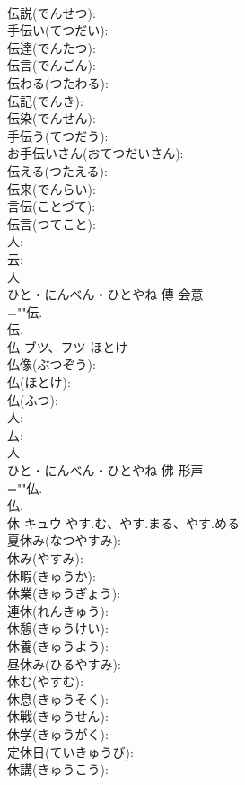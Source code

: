 \documentclass[8pt]{extreport}
\begin{document}
\begin{CJK}{UTF8}{min}
\\	伝説(でんせつ): 
\\	手伝い(てつだい): 
\\	伝達(でんたつ): 
\\	伝言(でんごん): 
\\	伝わる(つたわる): 
\\	伝記(でんき): 
\\	伝染(でんせん): 
\\	手伝う(てつだう): 
\\	お手伝いさん(おてつだいさん): 
\\	伝える(つたえる): 
\\	伝来(でんらい): 
\\	言伝(ことづて): 
\\	伝言(つてこと): 
\\	人: 
\\	云: 
\\	人	
\\	ひと・にんべん・ひとやね	傳	会意 
\\	=""伝.
\\	伝.
\\	仏	ブツ、フツ	ほとけ		
\\	仏像(ぶつぞう): 
\\	仏(ほとけ): 
\\	仏(ふつ): 
\\	人: 
\\	厶: 
\\	人	
\\	ひと・にんべん・ひとやね	佛	形声 
\\	=""仏.
\\	仏.
\\	休	キュウ	やす.む、やす.まる、やす.める		
\\	夏休み(なつやすみ): 
\\	休み(やすみ): 
\\	休暇(きゅうか): 
\\	休業(きゅうぎょう): 
\\	連休(れんきゅう): 
\\	休憩(きゅうけい): 
\\	休養(きゅうよう): 
\\	昼休み(ひるやすみ): 
\\	休む(やすむ): 
\\	休息(きゅうそく): 
\\	休戦(きゅうせん): 
\\	休学(きゅうがく): 
\\	定休日(ていきゅうび): 
\\	休講(きゅうこう): 

\end{CJK}
\end{document}
